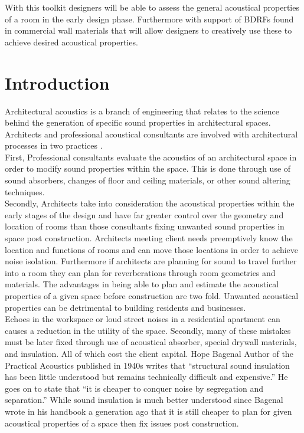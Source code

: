 \documentclass{thesis}
\begin{document}
With this toolkit designers will be able to assess the general acoustical properties of a room in the early design phase. Furthermore with support of BDRFs found in commercial wall materials that will allow designers to creatively use these to achieve desired acoustical properties.

\chapter{Introduction}

Architectural acoustics is a branch of engineering that relates to the science behind the generation of specific sound properties in architectural spaces. Architects and professional acoustical consultants are involved with architectural processes in two practices . \\

First, Professional consultants evaluate the acoustics of an architectural space in order to modify sound properties within the space. This is done through use of sound absorbers, changes of floor and ceiling materials, or other sound altering techniques.\\

Secondly, Architects take into consideration the acoustical properties within the early stages of the design and have far greater control over the geometry and location of rooms than those consultants fixing unwanted sound properties in space post construction. Architects meeting client needs preemptively know the location and functions of rooms and can move those locations in order to achieve noise isolation. Furthermore if architects are planning for sound to travel further into a room they can plan for reverberations through room geometries and materials. The advantages in being able to plan and estimate the acoustical properties of a given space before construction are two fold. Unwanted acoustical properties can be detrimental to building residents and businesses.\\

Echoes in the workspace or loud street noises in a residential apartment can causes a reduction in the utility of the space. Secondly, many of these mistakes must be later fixed through use of acoustical absorber, special drywall materials, and insulation. All of which cost the client capital. Hope Bagenal Author of the Practical Acoustics \cite{Begenal} published in 1940s writes that “structural sound insulation has been little understood but remains technically difficult and expensive.” He goes on to state that “it is cheaper to conquer noise by segregation and separation.” While sound insulation is much better understood since Bagenal wrote in his handbook a generation ago that it is still cheaper to plan for given acoustical properties of a space then fix issues post construction.\\
\end{document}
